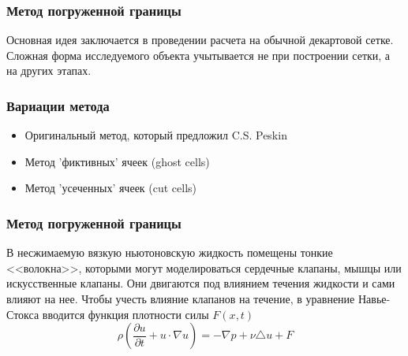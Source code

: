 \documentclass[14pt, notes]{beamer}
\begin{document}
\begin{frame}
\frametitle{Метод погруженной границы}
Основная идея заключается в проведении расчета на обычной декартовой сетке. Сложная форма исследуемого объекта учытывается не при построении сетки, а на других этапах.
\end{frame}

\begin{frame}
\frametitle{Вариации метода}
\begin{itemize}
    \item \alert<+>{Оригинальный метод, который предложил C.S. Peskin}
    \item \alert<+>{Метод 'фиктивных' ячеек (ghost cells)}
    \item \alert<+>{Метод 'усеченных' ячеек (cut cells)}
\end{itemize}
\end{frame}

\begin{frame}
\frametitle{Метод погруженной границы}
В несжимаемую вязкую ньютоновскую жидкость помещены тонкие <<волокна>>, которыми могут моделироваться сердечные клапаны, мышцы или искусственные клапаны. Они двигаются под влиянием течения жидкости и сами влияют на нее.
Чтобы учесть влияние клапанов на течение, в уравнение Навье-Стокса вводится функция плотности силы $F(x, t)$
\begin{equation}
    \rho (\frac{\partial u}{\partial t} + u \cdot \nabla u) = - \nabla p + \nu \triangle u + F
\end{equation}
\end{frame}
\end{document}
